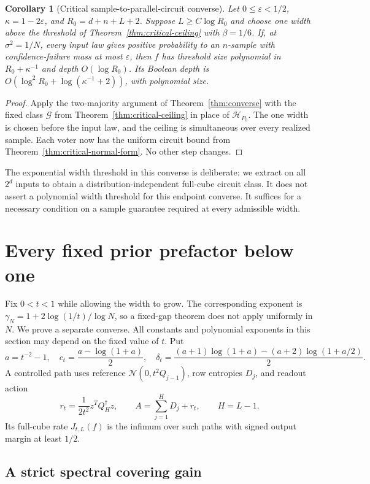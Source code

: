 \documentclass[11pt]{article}
\newtheorem{corollary}[theorem]{Corollary}
\theoremstyle{remark}
\begin{document}
\begin{corollary}[Critical sample-to-parallel-circuit converse]
\label{cor:critical-converse}
Let $0\le\varepsilon<1/2$, $\kappa=1-2\varepsilon$, and
$R_0=d+n+L+2$. Suppose $L\ge C\log R_0$ and choose one width
above the threshold of Theorem~\ref{thm:critical-ceiling} with
$\beta=1/6$. If, at $\sigma^2=1/N$, every input law gives
positive probability to an $n$-sample with confidence-failure
mass at most $\varepsilon$, then $f$ has threshold size polynomial
in $R_0+\kappa^{-1}$ and depth $O(\log R_0)$. Its Boolean depth
is $O(\log^2R_0+\log(\kappa^{-1}+2))$, with polynomial size.
\end{corollary}
\begin{proof}
Apply the two-majority argument of Theorem~\ref{thm:converse}
with the fixed class $\mathcal G$ from
Theorem~\ref{thm:critical-ceiling} in place of
$\mathcal H_{P_0}$. The one width is chosen before the input law,
and the ceiling is simultaneous over every realized sample.
Each voter now has the uniform circuit bound from
Theorem~\ref{thm:critical-normal-form}. No other step changes.
\end{proof}

The exponential width threshold in this converse is deliberate:
we extract on all $2^d$ inputs to obtain a distribution-independent
full-cube circuit class. It does not assert a polynomial width
threshold for this endpoint converse. It suffices for a necessary
condition on a sample guarantee required at every admissible width.

\section{Every fixed prior prefactor below one}
\label{sec:fixed-prefactor}

Fix $0<t<1$ while allowing the width to grow. The corresponding
exponent is $\gamma_N=1+2\log(1/t)/\log N$, so a fixed-gap theorem
does not apply uniformly in $N$. We prove a separate converse.
All constants and polynomial exponents in this section may depend
on the fixed value of $t$. Put
\[
 a=t^{-2}-1,\quad c_t=\frac{a-\log(1+a)}2,\quad
 \delta_t=\frac{(a+1)\log(1+a)-(a+2)\log(1+a/2)}2.
\]
A controlled path uses reference $\mathcal N(0,t^2Q_{j-1})$,
row entropies $D_j$, and readout action
\[
 r_t=\frac1{2t^2}z^TQ_H^\dagger z,\qquad
 A=\sum_{j=1}^H D_j+r_t,\qquad H=L-1.
\]
Its full-cube rate $J_{t,L}(f)$ is the infimum over such paths
with signed output margin at least $1/2$.

\subsection{A strict spectral covering gain}
\end{document}
